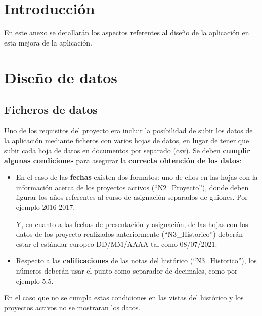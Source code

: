 
\section{Introducción}
En este anexo se detallarán los aspectos referentes al diseño de la aplicación en esta mejora de la aplicación.

\section{Diseño de datos}

\subsection{Ficheros de datos}

Uno de los requisitos del proyecto era incluir la posibilidad de subir los datos de la aplicación mediante ficheros con varios hojas de datos, en lugar de tener que subir cada hoja de datos en documentos por separado (csv). Se deben \textbf{cumplir algunas condiciones} para asegurar la \textbf{correcta obtención de los datos}:
\begin{itemize}
	\tightlist
	\item En el caso de las \textbf{fechas} existen dos formatos: uno de ellos en las hojas con la información acerca de los proyectos activos (``N2\_Proyecto''), donde deben figurar los años referentes al curso de asignación separados de guiones. Por ejemplo 2016-2017. 
	
	Y, en cuanto a las fechas de presentación y asignación, de las hojas con los datos de los proyecto realizados anteriormente (``N3\_Historico'') deberán estar el estándar europeo DD/MM/AAAA tal como 08/07/2021.
	
	\item Respecto a las \textbf{calificaciones} de las notas del histórico (``N3\_Historico''), los números deberán usar el punto como separador de decimales, como por ejemplo 5.5.
\end{itemize}

En el caso que no se cumpla estas condiciones en las vistas del histórico y los proyectos activos no se mostraran los datos.

